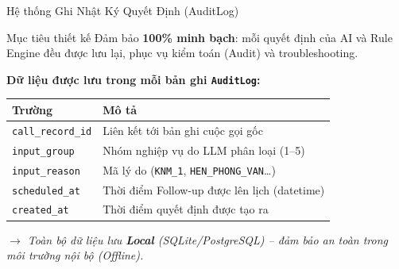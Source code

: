 \begin{frame}{Hệ thống Ghi Nhật Ký Quyết Định (AuditLog)}
    \begin{block}{Mục tiêu thiết kế}
        Đảm bảo \textbf{100\% minh bạch}: mỗi quyết định của AI và Rule Engine đều được lưu lại, phục vụ kiểm toán (Audit) và troubleshooting.
    \end{block}
    \vspace{0.2cm}
    \textbf{Dữ liệu được lưu trong mỗi bản ghi \texttt{AuditLog}:}
    \begin{table}[]
        \centering
        \begin{tabular}{|l|p{6.5cm}|}
            \hline
            \textbf{Trường} & \textbf{Mô tả} \\ \hline
            \texttt{call\_record\_id} & Liên kết tới bản ghi cuộc gọi gốc \\ \hline
            \texttt{input\_group} & Nhóm nghiệp vụ do LLM phân loại (1--5) \\ \hline
            \texttt{input\_reason} & Mã lý do (\texttt{KNM\_1}, \texttt{HEN\_PHONG\_VAN}\ldots) \\ \hline
            \texttt{scheduled\_at} & Thời điểm Follow-up được lên lịch (datetime) \\ \hline
            \texttt{created\_at} & Thời điểm quyết định được tạo ra \\ \hline
        \end{tabular}
    \end{table}
    \vspace{0.2cm}
    \textit{$\rightarrow$ Toàn bộ dữ liệu lưu \textbf{Local} (SQLite/PostgreSQL) -- đảm bảo an toàn trong môi trường nội bộ (Offline).}
\end{frame}


